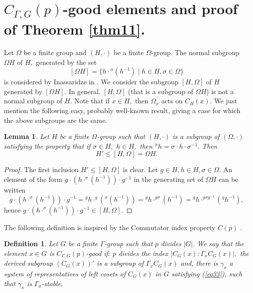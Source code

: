 \documentclass[pdflatex,sn-mathphys-num]{sn-jnl}
\numberwithin{equation}{section}
\theoremstyle{thmstyleone}
\newtheorem{lemma}{Lemma}
\theoremstyle{thmstyletwo}
\theoremstyle{thmstylethree}
\newtheorem{definition}{Definition}
\begin{document}
\section{\texorpdfstring{$C_{\Gamma,G}(p)$-good elements and proof of Theorem \ref{thm11}.}{C(Gamma,G,p)-good elements and proof of Theorem 1.1.}}\label{sec4}
Let  $\Omega$  be a finite group and $(H,\cdot)$ be a finite $\Omega$-group. The normal subgroup $\Omega H$ of $H,$ generated by  the set
$$[\Omega H]=\{h\cdot {}^{\sigma}(h^{-1})\mid h\in H, \sigma\in \Omega\}$$ is considered by Inassaridze in \citep{In}.
We consider the subgroup $[H,\Omega]$ of $H$ generated by $[\Omega H].$ In general,
$[H,\Omega]$ (that is  a subgroup of $\Omega H$) is not a normal subgroup of $H.$  Note that if $x\in H,$ then $\Omega_x$ acts on $C_H(x).$ We just mention the following easy, probably well-known result, giving a case for which the above subgroups are the same.
\begin{lemma}\label{lem41}
Let $H$ be a finite $\Omega$-group such that $(H,\cdot)$ is a subgroup of $(\Omega,\cdot)$ satisfying the property that if   $\sigma\in H,$ $h\in H,$ then $^{\sigma}h=\sigma\cdot h\cdot \sigma^{-1}.$ Then $$H'\leq [H,\Omega]=\Omega H.$$
\end{lemma}
\begin{proof}
The first inclusion $H'\leq [H,\Omega]$ is clear. Let $g\in H, h\in H, \sigma\in \Omega.$ An element of the form $g\cdot (h\cdot ^{\sigma}(h^{-1}))\cdot g^{-1}$ in the generating set of $\Omega H$ can be written
$$g\cdot (h\cdot ^{\sigma}(h^{-1}))\cdot g^{-1}={}^gh\cdot^g(^{\sigma}(h^{-1}))={}^gh\cdot ^{g\sigma}(h^{-1})={}^gh\cdot ^{g\sigma g^{-1}}(^gh^{-1}),$$
hence  $g \cdot (h\cdot ^{\sigma}(h^{-1}))\cdot g^{-1} \in [H,\Omega].$
\end{proof}
The following definition is inspired by the Commutator index property $C(p)$ \cite[Deefinition 1.1]{FJL}.
\begin{definition} \label{def41}
Let $G$ be a finite $\Gamma$-group such that $p$ divides $|G|.$ We say that the element $x\in G$ is $C_{\Gamma,G}(p)$-\textit{good} if:  $p$ divides the index $|C_{G}(x):\Gamma_xC_G(x)|,$ the derived subgroup $(C_G(x))'$ is a subgroup of $\Gamma_xC_G(x)$ and, there is $\gamma_x$ a system of representatives of left cosets of $C_G(x)$ in $G$ satisfying (\ref{eq33}), such that $\gamma_x$ is $\Gamma_x$-stable.
\end{definition}
\end{document}
